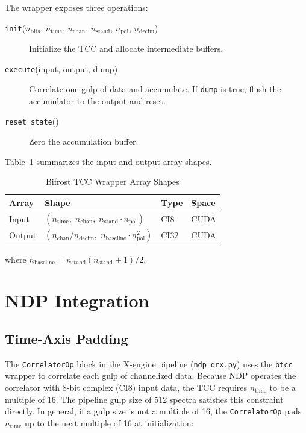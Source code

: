 The wrapper exposes three operations:

\begin{description}
    \item[\texttt{init}($n_\mathrm{bits}$, $n_\mathrm{time}$, $n_\mathrm{chan}$, $n_\mathrm{stand}$, $n_\mathrm{pol}$, $n_\mathrm{decim}$)] Initialize the TCC and allocate intermediate buffers.
    \item[\texttt{execute}(input, output, dump)] Correlate one gulp of data and accumulate.  If \texttt{dump} is true, flush the accumulator to the output and reset.
    \item[\texttt{reset\_state}()] Zero the accumulation buffer.
\end{description}

Table~\ref{tab:btcc-arrays} summarizes the input and output array shapes.

\begin{table}[htbp]
    \centering
    \caption{Bifrost TCC Wrapper Array Shapes}
    \label{tab:btcc-arrays}
    \begin{tabular}{llll}
        \toprule
        \textbf{Array} & \textbf{Shape} & \textbf{Type} & \textbf{Space} \\
        \midrule
        Input  & $(n_\mathrm{time},\; n_\mathrm{chan},\; n_\mathrm{stand} \cdot n_\mathrm{pol})$ & CI8 & CUDA \\
        Output & $(n_\mathrm{chan}/n_\mathrm{decim},\; n_\mathrm{baseline} \cdot n_\mathrm{pol}^2)$ & CI32 & CUDA \\
        \bottomrule
    \end{tabular}
\end{table}

\noindent where $n_\mathrm{baseline} = n_\mathrm{stand} (n_\mathrm{stand}+1)/2$.

\section{NDP Integration}

\subsection{Time-Axis Padding}

The \texttt{CorrelatorOp} block in the X-engine pipeline (\texttt{ndp\_drx.py}) uses the \texttt{btcc} wrapper to correlate each gulp of channelized data.  Because NDP operates the correlator with 8-bit complex (CI8) input data, the TCC requires $n_\mathrm{time}$ to be a multiple of 16.  The pipeline gulp size of 512 spectra satisfies this constraint directly.  In general, if a gulp size is not a multiple of 16, the \texttt{CorrelatorOp} pads $n_\mathrm{time}$ up to the next multiple of 16 at initialization:

